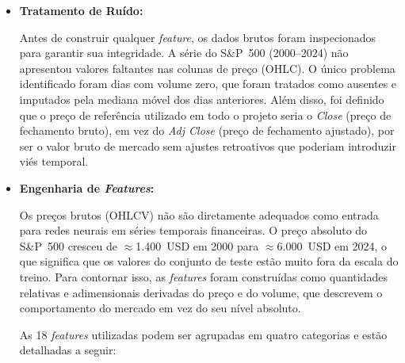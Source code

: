 \begin{itemize}
    \item \textbf{Tratamento de Ruído:}

    Antes de construir qualquer \textit{feature}, os dados brutos foram inspecionados para garantir sua integridade. A série do S\&P~500 (2000--2024) não apresentou valores faltantes nas colunas de preço (OHLC). O único problema identificado foram dias com volume zero, que foram tratados como ausentes e imputados pela mediana móvel dos dias anteriores. Além disso, foi definido que o preço de referência utilizado em todo o projeto seria o \textit{Close} (preço de fechamento bruto), em vez do \textit{Adj Close} (preço de fechamento ajustado), por ser o valor bruto de mercado sem ajustes retroativos que poderiam introduzir viés temporal.

    \item \textbf{Engenharia de \textit{Features}:}

    Os preços brutos (OHLCV) não são diretamente adequados como entrada para redes neurais em séries temporais financeiras. O preço absoluto do S\&P~500 cresceu de $\approx$1.400~USD em 2000 para $\approx$6.000~USD em 2024, o que significa que os valores do conjunto de teste estão muito fora da escala do treino. Para contornar isso, as \textit{features} foram construídas como quantidades relativas e adimensionais derivadas do preço e do volume, que descrevem o comportamento do mercado em vez do seu nível absoluto.

    As 18 \textit{features} utilizadas podem ser agrupadas em quatro categorias e estão detalhadas a seguir:


\end{itemize}
